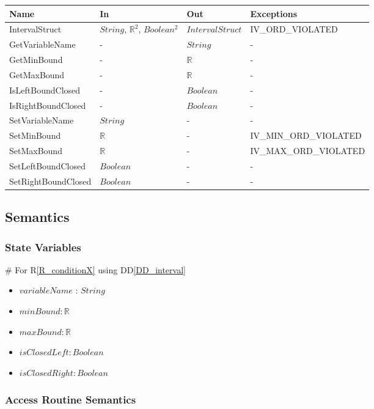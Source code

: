 \documentclass[12pt, titlepage]{article}
\newcommand{\rref}[1]{R\ref{#1}}
\newcommand{\ddref}[1]{DD\ref{#1}}
\begin{document}
\begin{center}
	\begin{tabular}{p{3.8cm} p{2.5cm} p{3cm} p{5cm}}
		\hline
		\textbf{Name} & \textbf{In} & \textbf{Out} & \textbf{Exceptions} \\
		\hline		
		IntervalStruct & $String$, $\mathbb{R}^2$, $Boolean^2$ & 
		$IntervalStruct$ & 
		IV\_ORD\_VIOLATED \\
		GetVariableName & - & $String$ & - \\
		GetMinBound & - & $\mathbb{R}$ & - \\
		GetMaxBound & - & $\mathbb{R}$ & - \\
		IsLeftBoundClosed & - & $Boolean$ & - \\
		IsRightBoundClosed & - & $Boolean$ & - \\
		SetVariableName & $String$ & - & - \\
		SetMinBound & $\mathbb{R}$ & - & IV\_MIN\_ORD\_VIOLATED \\
		SetMaxBound & $\mathbb{R}$ & - & IV\_MAX\_ORD\_VIOLATED \\
		SetLeftBoundClosed & $Boolean$ & - & - \\
		SetRightBoundClosed & $Boolean$ & - & - \\
		\hline
	\end{tabular}
\end{center}

\subsection{Semantics}

\subsubsection{State Variables}

\# For \rref{R_conditionX} using \ddref{DD_interval}
\begin{itemize}
	\item $variableName$ : $String$
	\item $minBound : \mathbb{R}$
	\item $maxBound : \mathbb{R}$
	\item $isClosedLeft : Boolean$
	\item $isClosedRight : Boolean$
\end{itemize}

\subsubsection{Access Routine Semantics}
\end{document}

